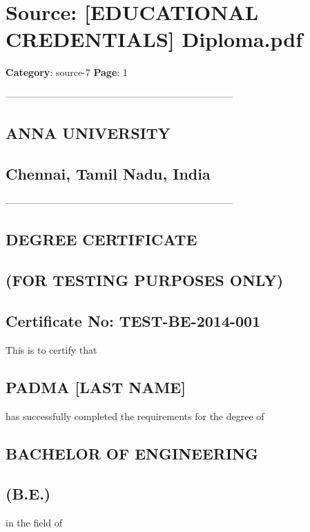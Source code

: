 \section*{Source: [EDUCATIONAL CREDENTIALS] Diploma.pdf}
\textbf{Category}: source-7
\textbf{Page}: 1

-----------------------------------------------------------------------

\subsection*{ANNA UNIVERSITY}

\subsection*{Chennai, Tamil Nadu, India}

-----------------------------------------------------------------------

\subsection*{DEGREE CERTIFICATE}

\subsection*{(FOR TESTING PURPOSES ONLY)}

\subsection*{Certificate No: TEST-BE-2014-001}

This is to certify that

\subsection*{PADMA [LAST NAME]}

has successfully completed the requirements for the degree of

\subsection*{BACHELOR OF ENGINEERING}

\subsection*{(B.E.)}

in the field of

